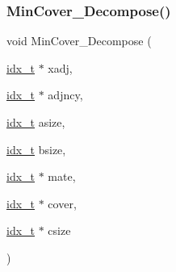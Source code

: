 \subsubsection{\texorpdfstring{Min\+Cover\+\_\+\+Decompose()}{MinCover\_Decompose()}}
{\footnotesize\ttfamily void Min\+Cover\+\_\+\+Decompose (\begin{DoxyParamCaption}\item[{\hyperlink{a00876_aaa5262be3e700770163401acb0150f52}{idx\+\_\+t} $\ast$}]{xadj,  }\item[{\hyperlink{a00876_aaa5262be3e700770163401acb0150f52}{idx\+\_\+t} $\ast$}]{adjncy,  }\item[{\hyperlink{a00876_aaa5262be3e700770163401acb0150f52}{idx\+\_\+t}}]{asize,  }\item[{\hyperlink{a00876_aaa5262be3e700770163401acb0150f52}{idx\+\_\+t}}]{bsize,  }\item[{\hyperlink{a00876_aaa5262be3e700770163401acb0150f52}{idx\+\_\+t} $\ast$}]{mate,  }\item[{\hyperlink{a00876_aaa5262be3e700770163401acb0150f52}{idx\+\_\+t} $\ast$}]{cover,  }\item[{\hyperlink{a00876_aaa5262be3e700770163401acb0150f52}{idx\+\_\+t} $\ast$}]{csize }\end{DoxyParamCaption})}

